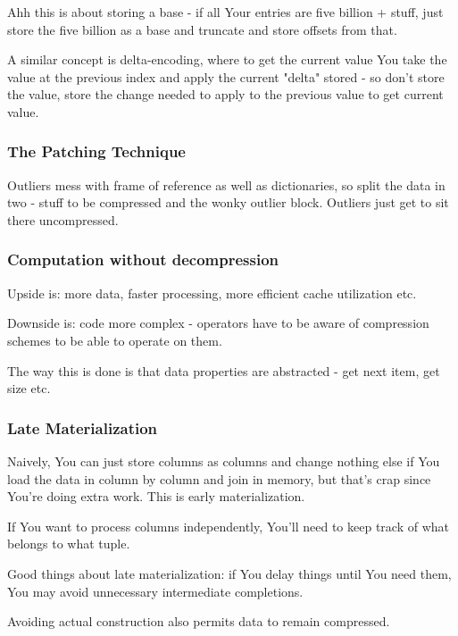 \documentclass{article}
\begin{document}
			Ahh this is about storing a base - if all Your entries are five billion + stuff, just store  the five billion as a base and truncate and store offsets from that.
			
			A similar concept is delta-encoding, where to get the current value You take the value at the previous index and apply the current "delta" stored - so don't store the value, store the change needed to apply to the previous value to get current value.
			
		\subsubsection{The Patching Technique}
		
			Outliers mess with frame of reference as well as dictionaries, so split the data in two - stuff to be compressed and the wonky outlier block. Outliers just get to sit there uncompressed.
	
		\subsubsection{Computation without decompression}
			
			Upside is: more data, faster processing, more efficient cache utilization etc.
			
			Downside is: code more complex - operators have to be aware of compression schemes to be able to operate on them.
			
			The way this is done is that data properties are abstracted - get next item, get size etc.
			
		\subsubsection{Late Materialization}
		
			Naively, You can just store columns as columns and change nothing else if You load the data in column by column and join in memory, but that's crap since You're doing extra work. This is early materialization.
			
			If You want to process columns independently, You'll need to keep track of what belongs to what tuple.
			
			Good things about late materialization: if You delay things until You need them, You may avoid unnecessary intermediate completions. 
			
			Avoiding actual construction also permits data to remain compressed.
			
\end{document}
